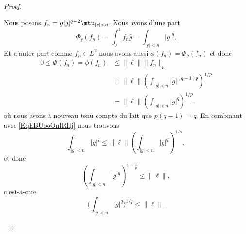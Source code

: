 \begin{proof}
\begin{subproof}
\begin{subproof}
                    Nous posons \( f_n=g| g |^{q-2}\mtu_{| g |<n}\). Nous avons d'une part
                    \begin{equation}    \label{EqEBUooOnlRHj}
                        \Phi_g(f_n)=\int_0^1f_n\bar g=\int_{| g |<n}| g |^q.
                    \end{equation}
                    Et d'autre part comme \( f_n\in L^2\) nous avons aussi \( \phi(f_n)=\Phi_g(f_n)\) et donc
                    \begin{subequations}
                        \begin{align}
                            0\leq \Phi(f_n)= \phi(f_n)&\leq \| \ell \|\| f_n \|_p\\
                            &=\| \ell \|\left( \int_{| g |<n}| g |^{(q-1)p} \right)^{1/p}\\
                            &=\| \ell \|\left( \int_{| g |<n}| g |^q \right)^{1/p}.
                        \end{align}
                    \end{subequations}
                    où nous avons à nouveau tenu compte du fait que \( p(q-1)=q\). En combinant avec \eqref{EqEBUooOnlRHj} nous trouvons
                    \begin{equation}
                        \int_{| g |<n}| g |^q\leq \| \ell \|\left( \int_{| g |<n}| g |^q \right)^{1/p},
                    \end{equation}
                    et donc
                    \begin{equation}
                        \left( \int_{| g |<n}| g |^{q} \right)^{1-\frac{1}{ p }}\leq \| \ell \|,
                    \end{equation}
                    c'est-à-dire
                    \begin{equation}
                        \Big( \int_{| g |<n}| g |^q \Big)^{1/q}\leq \| \ell \|.
                    \end{equation}


\end{subproof}
\end{subproof}
\end{proof}
